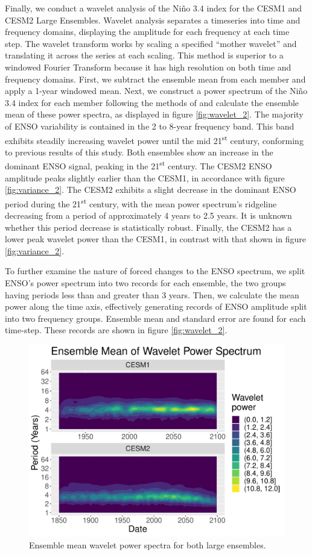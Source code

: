 \documentclass[11pt]{article}
\begin{document}
Finally, we conduct a wavelet analysis of the Niño 3.4 index for the CESM1 and CESM2 Large Ensembles. Wavelet analysis separates a timeseries into time and frequency domains, displaying the amplitude for each frequency at each time step. The wavelet transform works by scaling a specified ``mother wavelet'' and translating it across the series at each scaling. This method is superior to a windowed Fourier Transform because it has high resolution on both time and frequency domains. First, we subtract the ensemble mean from each member and apply a 1-year windowed mean. Next, we construct a power spectrum of the Niño 3.4 index for each member following the methods of \cite{torrence1998practical} and calculate the ensemble mean of these power spectra, as displayed in figure \ref{fig:wavelet_2}. The majority of ENSO variability is contained in the 2 to 8-year frequency band. This band exhibits steadily increasing wavelet power until the mid 21\textsuperscript{st} century, conforming to previous results of this study. Both ensembles show an increase in the dominant ENSO signal, peaking in the 21\textsuperscript{st} century. The CESM2 ENSO amplitude peaks slightly earlier than the CESM1, in accordance with figure \ref{fig:variance_2}. The CESM2 exhibits a slight decrease in the dominant ENSO period during the 21\textsuperscript{st} century, with the mean power spectrum's ridgeline decreasing from a period of approximately 4 years to 2.5 years. It is unknown whether this period decrease is statistically robust. Finally, the CESM2 has a lower peak wavelet power than the CESM1, in contrast with that shown in figure \ref{fig:variance_2}.

To further examine the nature of forced changes to the ENSO spectrum, we split ENSO's power spectrum into two records for each ensemble, the two groups having periods less than and greater than 3 years. Then, we calculate the mean power along the time axis, effectively generating records of ENSO amplitude split into two frequency groups. Ensemble mean and standard error are found for each time-step. These records are shown in figure \ref{fig:wavelet_2}.

\begin{figure}
\centering
\includegraphics[width=.5\linewidth]{../../data/figures/wavelet2.pdf}
\caption{\label{fig:wavelet_1}Ensemble mean wavelet power spectra for both large ensembles.}
\end{figure}
\end{document}
